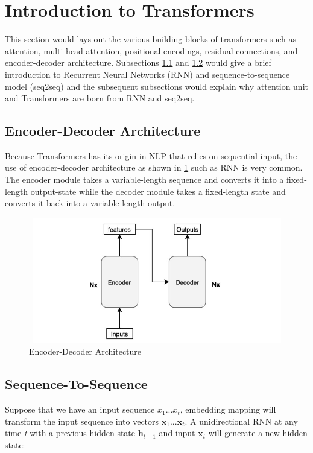 \section{Introduction to Transformers}
This section would  lays out the various building blocks of transformers such as attention, multi-head attention, positional encodings, residual connections, and encoder-decoder architecture. Subsections \ref{subsection: encoder-decoder} and \ref{subsection: sequence} would give a brief introduction to Recurrent Neural Networks (RNN) and sequence-to-sequence model (seq2seq) and the subsequent subsections would explain why attention unit and Transformers are born from RNN and seq2seq. 
\subsection{Encoder-Decoder Architecture} \label{subsection: encoder-decoder}

Because Transformers has its origin in NLP that relies on sequential input, the use of encoder-decoder architecture as shown in \ref{fig:encoder-decoder} such as RNN is very common. The encoder module takes a variable-length sequence and converts it into a fixed-length output-state while the decoder module takes a fixed-length state and converts it back into a variable-length output.
\begin{figure}[ht]
\includegraphics[width=13.5cm, height=5.5cm]{images/encodeer-decoder.jpg}
\centering
\caption{Encoder-Decoder Architecture}
\label{fig:encoder-decoder}
\end{figure}



\subsection{Sequence-To-Sequence} \label{subsection: sequence}

Suppose that we have an input sequence $x_1...x_t$, embedding mapping will transform the input sequence into vectors $\mathbf{x}_1...\mathbf{x}_t$. A unidirectional RNN at any time \textit{t} with a previous hidden state $\mathbf{h}_{t-1}$ and input $\mathbf{x}_t$ will generate a new hidden state:

